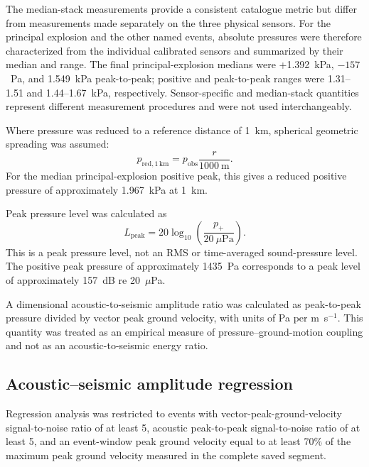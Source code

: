 \documentclass[]{seismica}
\begin{document}
The median-stack measurements provide a consistent catalogue metric but differ
from measurements made separately on the three physical sensors. For the
principal explosion and the other named events, absolute pressures were
therefore characterized from the individual calibrated sensors and summarized
by their median and range. The final principal-explosion medians were
+1.392~kPa, $-157$~Pa, and 1.549~kPa peak-to-peak; positive and peak-to-peak
ranges were 1.31--1.51 and 1.44--1.67~kPa, respectively. Sensor-specific and
median-stack quantities represent different measurement procedures and were
not used interchangeably.

Where pressure was reduced to a reference distance of 1~km, spherical geometric spreading was assumed:
\begin{equation}
  p_{\mathrm{red},1\,\mathrm{km}} = p_{\mathrm{obs}}\frac{r}{1000~\mathrm{m}}.
  \label{eq:reduced_pressure}
\end{equation}
For the median principal-explosion positive peak, this gives a reduced positive
pressure of approximately 1.967~kPa at 1~km.

Peak pressure level was calculated as
\begin{equation}
  L_{\mathrm{peak}} = 20\log_{10}\left(\frac{p_+}{20~\mu\mathrm{Pa}}\right).
  \label{eq:peak_pressure_level}
\end{equation}
This is a peak pressure level, not an RMS or time-averaged sound-pressure level. The positive peak pressure of approximately 1435~Pa corresponds to a peak level of approximately 157~dB re 20~$\mu$Pa.

A dimensional acoustic-to-seismic amplitude ratio was calculated as peak-to-peak pressure divided by vector peak ground velocity, with units of Pa per m~s$^{-1}$. This quantity was treated as an empirical measure of pressure--ground-motion coupling and not as an acoustic-to-seismic energy ratio.

\subsection{Acoustic--seismic amplitude regression}

Regression analysis was restricted to events with vector-peak-ground-velocity signal-to-noise ratio of at least 5, acoustic peak-to-peak signal-to-noise ratio of at least 5, and an event-window peak ground velocity equal to at least 70\% of the maximum peak ground velocity measured in the complete saved segment.
\end{document}

